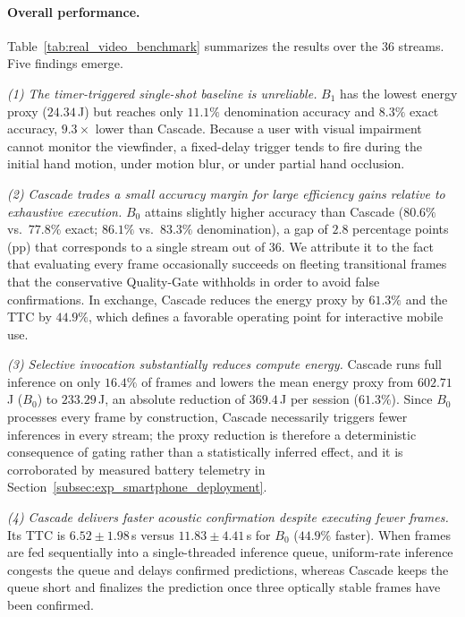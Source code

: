 \documentclass[final,5p,times,twocolumn,authoryear]{elsarticle}
\begin{document}
\paragraph{Overall performance.}
Table~\ref{tab:real_video_benchmark} summarizes the results over the 36 streams. Five findings emerge.

\textit{(1) The timer-triggered single-shot baseline is unreliable.} $B_1$ has the lowest energy proxy ($24.34$\,J) but reaches only $11.1\%$ denomination accuracy and $8.3\%$ exact accuracy, $9.3\times$ lower than Cascade. Because a user with visual impairment cannot monitor the viewfinder, a fixed-delay trigger tends to fire during the initial hand motion, under motion blur, or under partial hand occlusion.

\textit{(2) Cascade trades a small accuracy margin for large efficiency gains relative to exhaustive execution.} $B_0$ attains slightly higher accuracy than Cascade ($80.6\%$ vs.\ $77.8\%$ exact; $86.1\%$ vs.\ $83.3\%$ denomination), a gap of $2.8$ percentage points (pp) that corresponds to a single stream out of 36. We attribute it to the fact that evaluating every frame occasionally succeeds on fleeting transitional frames that the conservative Quality-Gate withholds in order to avoid false confirmations. In exchange, Cascade reduces the energy proxy by $61.3\%$ and the TTC by $44.9\%$, which defines a favorable operating point for interactive mobile use.

\textit{(3) Selective invocation substantially reduces compute energy.} Cascade runs full inference on only $16.4\%$ of frames and lowers the mean energy proxy from $602.71$\,J ($B_0$) to $233.29$\,J, an absolute reduction of $369.4$\,J per session ($61.3\%$). Since $B_0$ processes every frame by construction, Cascade necessarily triggers fewer inferences in every stream; the proxy reduction is therefore a deterministic consequence of gating rather than a statistically inferred effect, and it is corroborated by measured battery telemetry in Section~\ref{subsec:exp_smartphone_deployment}.

\textit{(4) Cascade delivers faster acoustic confirmation despite executing fewer frames.} Its TTC is $6.52 \pm 1.98$\,s versus $11.83 \pm 4.41$\,s for $B_0$ ($44.9\%$ faster). When frames are fed sequentially into a single-threaded inference queue, uniform-rate inference congests the queue and delays confirmed predictions, whereas Cascade keeps the queue short and finalizes the prediction once three optically stable frames have been confirmed.
\end{document}
